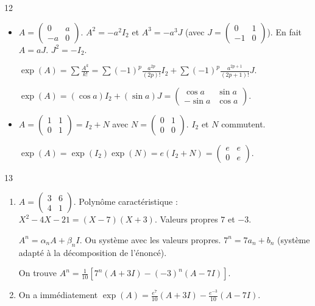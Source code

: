 \begin{correction}{12}
\begin{itemize}
    \item $A = \begin{pmatrix} 0 & a \\ -a & 0 \end{pmatrix}$.
        $A^2 = -a^2 I_2$ et $A^3 = -a^3 J$ (avec $J=\begin{pmatrix} 0 & 1 \\ -1 & 0 \end{pmatrix}$).
        En fait $A = a J$. $J^2 = -I_2$.
            
        $\exp(A) = \sum \frac{A^k}{k!} = \sum (-1)^p \frac{a^{2p}}{(2p)!} I_2 + \sum (-1)^p \frac{a^{2p+1}}{(2p+1)!} J$.

        $\exp(A) = (\cos a) I_2 + (\sin a) J = \begin{pmatrix} \cos a & \sin a \\ -\sin a & \cos a \end{pmatrix}$.
    \item $A = \begin{pmatrix} 1 & 1 \\ 0 & 1 \end{pmatrix} = I_2 + N$ avec $N=\begin{pmatrix} 0 & 1 \\ 0 & 0 \end{pmatrix}$.
        $I_2$ et $N$ commutent. 
        
        $\exp(A) = \exp(I_2)\exp(N) = e (I_2+N) = \begin{pmatrix} e & e \\ 0 & e \end{pmatrix}$.
\end{itemize}
\end{correction}

\begin{correction}{13}
\begin{enumerate}
    \item $A = \begin{pmatrix} 3 & 6 \\ 4 & 1 \end{pmatrix}$. Polynôme caractéristique : $X^2 - 4X - 21 = (X-7)(X+3)$.
        Valeurs propres $7$ et $-3$.

        $A^n = \alpha_n A + \beta_n I$. Ou système avec les valeurs propres.
        $7^n = 7a_n + b_n$ (système adapté à la décomposition de l'énoncé).

        On trouve $A^n = \frac{1}{10} [ 7^n (A+3I) - (-3)^n (A-7I)]$.

    \item On a immédiatement $\exp(A) = \frac{e^7}{10}(A+3I) - \frac{e^{-3}}{10}(A-7I)$.
\end{enumerate}
\end{correction}

